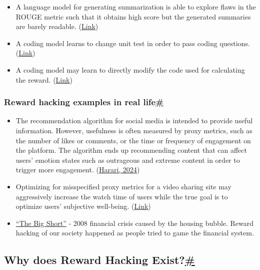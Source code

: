 \begin{itemize}
\tightlist
\item
  A language model for generating summarization is able to explore flaws in the ROUGE metric such that it obtains high score but the generated summaries are barely readable. (\href{https://web.archive.org/web/20180215132021/https://www.salesforce.com/products/einstein/ai-research/tl-dr-reinforced-model-abstractive-summarization/}{Link})
\item
  A coding model learns to change unit test in order to pass coding questions. (\href{https://arxiv.org/abs/2406.10162}{Link})
\item
  A coding model may learn to directly modify the code used for calculating the reward. (\href{https://arxiv.org/abs/2406.10162}{Link})
\end{itemize}

\subsubsection{\texorpdfstring{Reward hacking examples in real life\hyperref[reward-hacking-examples-in-real-life]{\#}}{Reward hacking examples in real life\#}}\label{reward-hacking-examples-in-real-life}

\begin{itemize}
\tightlist
\item
  The recommendation algorithm for social media is intended to provide useful information. However, usefulness is often measured by proxy metrics, such as the number of likes or comments, or the time or frequency of engagement on the platform. The algorithm ends up recommending content that can affect users' emotion states such as outrageous and extreme content in order to trigger more engagement. (\href{https://www.goodreads.com/en/book/show/204927599-nexus}{Harari, 2024})
\item
  Optimizing for misspecified proxy metrics for a video sharing site may aggressively increase the watch time of users while the true goal is to optimize users' subjective well-being. (\href{https://arxiv.org/abs/2201.03544}{Link})
\item
  \href{https://en.wikipedia.org/wiki/The_Big_Short}{``The Big Short''} - 2008 financial crisis caused by the housing bubble. Reward hacking of our society happened as people tried to game the financial system.
\end{itemize}

\subsection{\texorpdfstring{Why does Reward Hacking Exist?\hyperref[why-does-reward-hacking-exist]{\#}}{Why does Reward Hacking Exist?\#}}\label{why-does-reward-hacking-exist}


